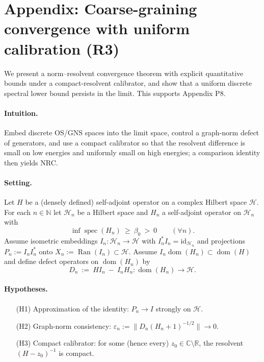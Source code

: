 \documentclass[11pt]{amsart}
\theoremstyle{plain}
\theoremstyle{definition}
\theoremstyle{remark}
\begin{document}
\section{Appendix: Coarse-graining convergence with uniform calibration (R3)}

We present a norm–resolvent convergence theorem with explicit quantitative bounds under a compact-resolvent calibrator, and show that a uniform discrete spectral lower bound persists in the limit. This supports Appendix P8.

\paragraph{Intuition.} Embed discrete OS/GNS spaces into the limit space, control a graph-norm defect of generators, and use a compact calibrator so that the resolvent difference is small on low energies and uniformly small on high energies; a comparison identity then yields NRC.

\paragraph{Setting.}
Let $H$ be a (densely defined) self-adjoint operator on a complex Hilbert space $\mathcal H$. For each $n\in\mathbb N$ let $\mathcal H_n$ be a Hilbert space and $H_n$ a self-adjoint operator on $\mathcal H_n$ with
\[
  \inf\operatorname{spec}(H_n)\ \ge\ \beta_0\ >\ 0\qquad(\forall n).
\]
Assume isometric embeddings $I_n:\mathcal H_n\to\mathcal H$ with $I_n^*I_n=\mathrm{id}_{\mathcal H_n}$ and projections $P_n:=I_n I_n^*$ onto $X_n:=\operatorname{Ran}(I_n)\subset\mathcal H$. Assume $I_n\operatorname{dom}(H_n)\subset\operatorname{dom}(H)$ and define defect operators on $\operatorname{dom}(H_n)$ by
\[
  D_n\ :=\ H I_n\ -\ I_n H_n: \operatorname{dom}(H_n)\to\mathcal H.
\]

\paragraph{Hypotheses.}
\begin{itemize}
  \item[(H1)] Approximation of the identity: $P_n\to I$ strongly on $\mathcal H$.
  \item[(H2)] Graph-norm consistency: $\varepsilon_n:=\bigl\| D_n (H_n+1)^{-1/2}\bigr\|\to 0$.
  \item[(H3)] Compact calibrator: for some (hence every) $z_0\in\mathbb C\setminus\mathbb R$, the resolvent $(H-z_0)^{-1}$ is compact.
\end{itemize}
\end{document}

